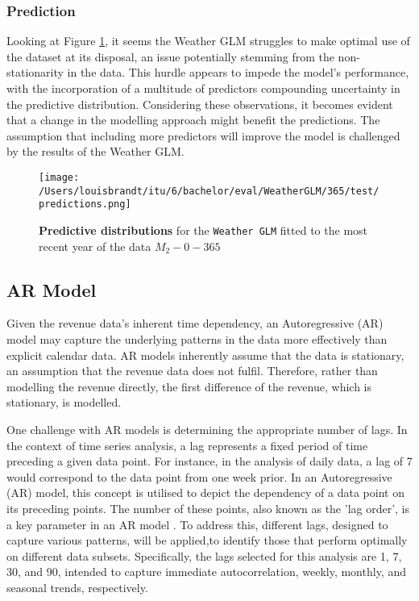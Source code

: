 \subsubsection{Prediction}

Looking at Figure \ref{fig:weather_glm_365_predictions}, it seems the Weather
GLM struggles to make optimal use of the dataset at its disposal, an issue
potentially stemming from the non-stationarity in the data. This hurdle appears
to impede the model's performance, with the incorporation of a multitude of
predictors compounding uncertainty in the predictive distribution. Considering
these observations, it becomes evident that a change in the modelling approach
might benefit the predictions. The assumption that including more predictors
will improve the model is challenged by the results of the Weather GLM.
\begin{figure}[h]
  \centering
  \texttt{[image: /Users/louisbrandt/itu/6/bachelor/eval/WeatherGLM/365/test/predictions.png]}
  \caption{\textbf{Predictive distributions} for the \texttt{Weather GLM} fitted to the most recent year of the data $M_2{-}0{-}365$}
  \label{fig:weather_glm_365_predictions}
\end{figure}
\subsection{AR Model}
Given the revenue data's inherent time dependency, an Autoregressive (AR) model
may capture the underlying patterns in the data more effectively than explicit
calendar data. AR models inherently assume that the data is stationary, an
assumption that the revenue data does not fulfil. Therefore, rather than
modelling the revenue directly, the first difference of the revenue, which is
stationary, is modelled.

One challenge with AR models is determining the appropriate number of lags. In
the context of time series analysis, a lag represents a fixed period of time
preceding a given data point. For instance, in the analysis of daily data, a
lag of 7 would correspond to the data point from one week prior. In an
Autoregressive (AR) model, this concept is utilised to depict the dependency of
a data point on its preceding points. The number of these points, also known as
the 'lag order', is a key parameter in an AR model \cite{time-series1}. To address this,
different lags, designed to capture various patterns, will be applied,to
identify those that perform optimally on different data subsets. Specifically,
the lags selected for this analysis are 1, 7, 30, and 90, intended to capture
immediate autocorrelation, weekly, monthly, and seasonal trends, respectively.
